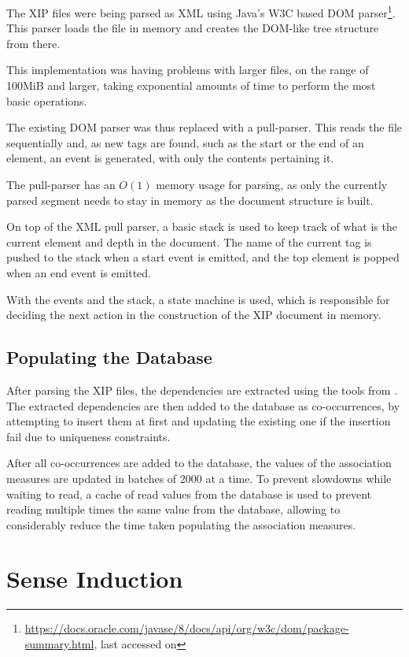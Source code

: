 The \ac{XIP} files were being parsed as XML using Java's W3C based \ac{DOM}
parser\footnote{\url{https://docs.oracle.com/javase/8/docs/api/org/w3c/dom/package-summary.html},
last accessed on }. This parser loads the file in memory and
creates the \ac{DOM}-like tree structure from there.

This implementation was having problems with larger files, on the range of
100MiB and larger, taking exponential amounts of time to perform the most basic
operations.

The existing \ac{DOM} parser was thus replaced with a pull-parser. This reads
the file sequentially and, as new tags are found, such as the start or the
end of an element, an event is generated, with only the contents pertaining it.

The pull-parser has an $O(1)$ memory usage for parsing, as only the currently
parsed segment needs to stay in memory as the document structure is built.

On top of the XML pull parser, a basic stack is used to keep track of what is
the current element and depth in the document. The name of the current tag
is pushed to the stack when a start event is emitted, and the top element is
popped when an end event is emitted.

With the events and the stack, a state machine is used, which is responsible for
deciding the next action in the construction of the XIP document in memory.

\subsection{Populating the Database}

After parsing the \ac{XIP} files, the dependencies are extracted using the
tools from \citep{correia2015syntax}. The extracted dependencies are then added
to the database as co-occurrences, by attempting to insert them at first and
updating the existing one if the insertion fail due to uniqueness constraints.

After all co-occurrences are added to the database, the values of the
association measures are updated in batches of 2000 at a time. To prevent
slowdowns while waiting to read, a cache of read values from the database is
used to prevent reading multiple times the same value from the database,
allowing to considerably reduce the time taken populating the association
measures.

\section{Sense Induction}

